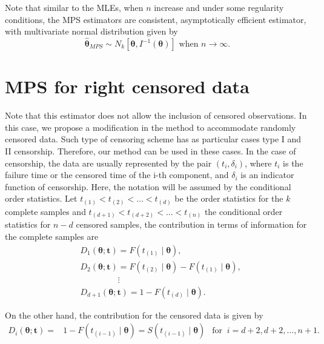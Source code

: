 \documentclass[10pt,a4paper,onecolumn]{article} %
\begin{document}
Note that similar to the MLEs, when $n$ increase and under some regularity conditions, the MPS estimators are consistent, asymptotically efficient estimator, with multivariate normal distribution given by
\begin{equation*}
\hat{\boldsymbol{\theta}}_{MPS}\sim N_k\left[\boldsymbol{\theta},I^{-1}(\boldsymbol{\theta})\right] \mbox{ when } n \to \infty .
\end{equation*}

\section{MPS for right censored data}

Note that this estimator does not allow the inclusion of censored observations. In this case, we propose a modification in the method to accommodate randomly censored data. Such type of censoring scheme has as particular cases type I and II censorship. Therefore, our method can be used in these cases. In the case of censorship, the data are usually represented by the pair $(t_i,\delta_i )$, where $t_i$ is the failure time or the censored time of the i-th component, and $\delta_i$ is an indicator function of censorship. 
Here, the notation will be assumed by the conditional order statistics. Let $t_{(1)}< t_{(2)}< \ldots < t_{(d)}$ be the order statistics for the $k$ complete samples and $t_{(d+1)}< t_{(d+2)}< \ldots < t_{(n)}$ the conditional order statistics for  $n-d$ censored samples, the contribution in terms of information for the complete samples are
\begin{equation}
\begin{aligned}
& D_{1}(\boldsymbol{\theta};\boldsymbol{t})=F\left( t_{(1)}\mid\boldsymbol{\theta}\right),
 \\ & D_{2}(\boldsymbol{\theta};\boldsymbol{t})=F\left( t_{(2)}\mid\boldsymbol{\theta}\right)
-F\left( t_{(1)}\mid \boldsymbol{\theta} \right), \\ &
 \ \ \quad \quad \quad \quad  \vdots
 \\ & D_{d+1}(\boldsymbol{\theta};\boldsymbol{t})=1-F\left( t_{(d)}\mid \boldsymbol{\theta} \right).
\end{aligned}
\end{equation}

On the other hand, the contribution for the censored data is given by
\begin{equation}
\begin{aligned}
D_{i}(\boldsymbol{\theta};\boldsymbol{t})=&1-F\left( t_{(i-1)}\mid \boldsymbol{\theta} \right)=S(t_{(i-1)}\mid \boldsymbol{\theta} ) \ \ \mbox{ for } \  i=d+2,d+2,\ldots ,n+1 .
\end{aligned}
\end{equation}
\end{document}
